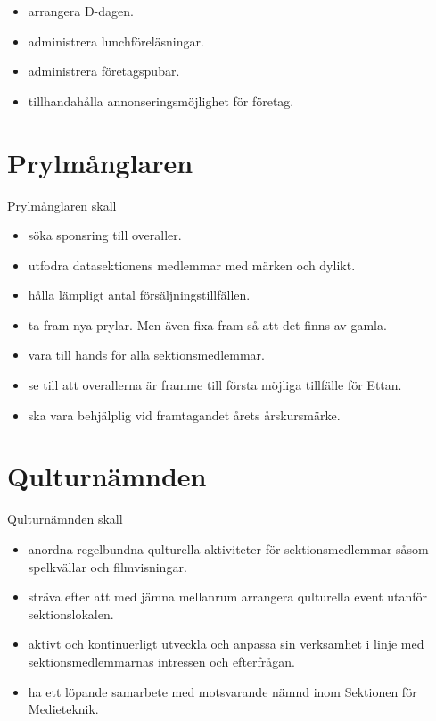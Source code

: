 \documentclass{dgovdoc}
\begin{document}
\begin{itemize}
\item arrangera D-dagen.
\item administrera lunchföreläsningar.
\item administrera företagspubar.
\item tillhandahålla annonseringsmöjlighet för företag.
\end{itemize}

\section{Prylmånglaren}

Prylmånglaren skall

\begin{itemize}
\item söka sponsring till overaller.
\item utfodra datasektionens medlemmar med märken och dylikt.
\item hålla lämpligt antal försäljningstillfällen.
\item ta fram nya prylar. Men även fixa fram så att det finns av gamla.
\item vara till hands för alla sektionsmedlemmar.
\item se till att overallerna är framme till första möjliga tillfälle för
  Ettan.
\item ska vara behjälplig vid framtagandet årets årskursmärke.
\end{itemize}

\section{Qulturnämnden}

Qulturnämnden skall

\begin{itemize}
\item anordna regelbundna qulturella aktiviteter för sektionsmedlemmar såsom
  spelkvällar och filmvisningar.
\item sträva efter att med jämna mellanrum arrangera qulturella event utanför
  sektionslokalen.
\item aktivt och kontinuerligt utveckla och anpassa sin verksamhet i linje med
  sektionsmedlemmarnas intressen och efterfrågan.
\item ha ett löpande samarbete med motsvarande nämnd inom Sektionen för
  Medieteknik.
\end{itemize}
\end{document}
